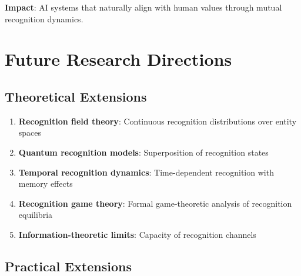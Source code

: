 \documentclass[11pt,a4paper]{article}
\theoremstyle{definition}
\theoremstyle{remark}
\begin{document}
\textbf{Impact}: AI systems that naturally align with human values through mutual recognition dynamics.

\section{Future Research Directions}
\label{sec:future-research}

\subsection{Theoretical Extensions}

\begin{enumerate}
\item \textbf{Recognition field theory}: Continuous recognition distributions over entity spaces
\item \textbf{Quantum recognition models}: Superposition of recognition states
\item \textbf{Temporal recognition dynamics}: Time-dependent recognition with memory effects
\item \textbf{Recognition game theory}: Formal game-theoretic analysis of recognition equilibria
\item \textbf{Information-theoretic limits}: Capacity of recognition channels
\end{enumerate}

\subsection{Practical Extensions}
\end{document}
